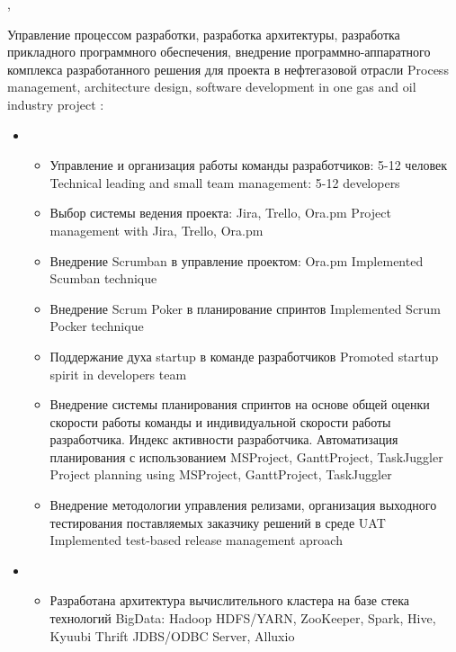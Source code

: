 \documentclass[11pt,a4paper,sans, russian]{moderncv}        %
\begin{document}
{\protect{}}
{\cityspb, \country}
{}
{
	{Управление процессом разработки, разработка архитектуры, разработка прикладного программного обеспечения, внедрение программно-аппаратного комплекса разработанного решения для проекта в нефтегазовой отрасли}
	{Process management, architecture design, software development in one gas and oil industry project}
	\newline{}
	\achievements:
	\begin{itemize}
		\item {}
		\begin{itemize}
			\item {}
				{Управление и организация работы команды разработчиков: 5-12 человек}
				{Technical leading and small team management: 5-12 developers}
			\item {}
				{Выбор системы ведения проекта: Jira, Trello, Ora.pm}
				{Project management with Jira, Trello, Ora.pm}
			\item {}
				{Внедрение Scrumban в управление проектом: Ora.pm}
				{Implemented Scumban technique}
			\item {}
				{Внедрение Scrum Poker в планирование спринтов}
				{Implemented Scrum Pocker technique}
			\item {}
				{Поддержание духа startup в команде разработчиков}
				{Promoted startup spirit in developers team}
			\item {}
				{Внедрение системы планирования спринтов на основе общей оценки скорости работы команды и индивидуальной скорости работы разработчика. Индекс активности разработчика. Автоматизация планирования с использованием MSProject, GanttProject, TaskJuggler}
				{Project planning using MSProject, GanttProject, TaskJuggler}
			\item {}
				{Внедрение методологии управления релизами, организация выходного тестирования поставляемых заказчику решений в среде UAT}
				{Implemented test-based release management aproach}
		\end{itemize}
		\item {}
		\begin{itemize}
			\item {}
				{Разработана архитектура вычислительного кластера на базе стека технологий BigData: Hadoop HDFS/YARN, ZooKeeper, Spark, Hive, Kyuubi Thrift JDBS/ODBC Server, Alluxio}

\end{itemize}
\end{itemize}}
\end{document}
